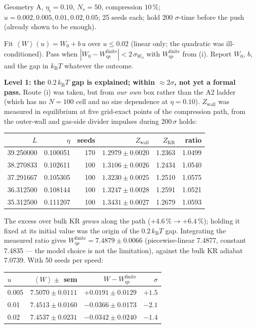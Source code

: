\documentclass[11pt,a4paper]{article}
\newcommand{\kT}{k_{\mathrm B}T}
\newcommand{\avg}[1]{\left\langle #1 \right\rangle}
\begin{document}
\begin{run}
Geometry A, $\eta_i = 0.10$, $N_s = 50$, compression $10\,\%$; $u = 0.002, 0.005, 0.01, 0.02, 0.05$; 25 seeds each; hold 200 $\sigma$-time before the push (already shown to be enough).
\end{run}
\begin{pass}
Fit $\avg W(u) = W_0 + b\,u$ over $u \le 0.02$ (linear only; the quadratic was ill-conditioned). Pass when $|W_0 - W_{\mathrm{qs}}^{\mathrm{finite}}| < 2\,\sigma_{W_0}$ with $W_{\mathrm{qs}}^{\mathrm{finite}}$ from (i). Report $W_0$, $b$, and the gap in $\kT$ whatever the outcome.
\end{pass}
\begin{res}
\textbf{Level 1: the $0.2\,\kT$ gap is explained; within $\approx 2\sigma$, not yet a formal pass.}
Route (i) was taken, but from \emph{our own} box rather than the A2 ladder (which has no $N=100$ cell and no size dependence at $\eta = 0.10$). $Z_{\mathrm{wall}}$ was measured in equilibrium at five grid-exact points of the compression path, from the outer-wall and gas-side divider impulses during 200\,$\sigma$ holds:

\begin{center}\footnotesize
\begin{tabular}{@{}rrrrrr@{}}
\toprule
$L$ & $\eta$ & seeds & $Z_{\mathrm{wall}}$ & $Z_{\mathrm{KR}}$ & ratio\\
\midrule
39.250000 & 0.100051 & 170 & $1.2979\pm0.0020$ & 1.2363 & 1.0499\\
38.270833 & 0.102611 & 100 & $1.3106\pm0.0026$ & 1.2434 & 1.0540\\
37.291667 & 0.105305 & 100 & $1.3230\pm0.0025$ & 1.2510 & 1.0575\\
36.312500 & 0.108144 & 100 & $1.3247\pm0.0028$ & 1.2591 & 1.0521\\
35.312500 & 0.111207 & 100 & $1.3431\pm0.0027$ & 1.2679 & 1.0593\\
\bottomrule
\end{tabular}
\end{center}

The excess over bulk KR \emph{grows} along the path ($+4.6\,\%\to+6.4\,\%$); holding it fixed at its initial value was the origin of the $0.2\,\kT$ gap. Integrating the measured ratio gives $W_{\mathrm{qs}}^{\mathrm{finite}} = 7.4879 \pm 0.0066$ (piecewise-linear 7.4877, constant 7.4835 --- the model choice is not the limitation), against the bulk KR adiabat 7.0739. With 50 seeds per speed:

\begin{center}\footnotesize
\begin{tabular}{@{}lrrr@{}}
\toprule
$u$ & $\avg W \pm$ sem & $W - W_{\mathrm{qs}}^{\mathrm{finite}}$ & $\sigma$\\
\midrule
0.005 & $7.5070\pm0.0111$ & $+0.0191\pm0.0129$ & $+1.5$\\
0.01 & $7.4513\pm0.0160$ & $-0.0366\pm0.0173$ & $-2.1$\\
0.02 & $7.4537\pm0.0231$ & $-0.0342\pm0.0240$ & $-1.4$\\
\bottomrule
\end{tabular}
\end{center}


\end{res}
\end{document}
